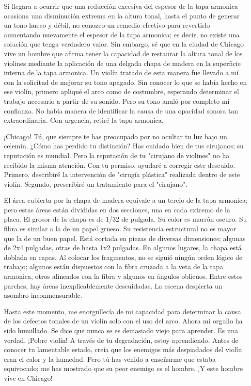 \documentclass[12pt]{book}
\begin{document}
Si llegara a ocurrir que una reducción excesiva del espesor de la tapa armonica ocasiona una disminución extrema en la altura tonal, hasta el punto de generar un tono hueco y débil, no conozco un remedio efectivo para revertirlo aumentando nuevamente el espesor de la tapa armonica; es decir, no existe una solución que tenga verdadero valor. Sin embargo, sé que en la ciudad de Chicago vive un hombre que afirma tener la capacidad de restaurar la altura tonal de los violines mediante la aplicación de una delgada chapa de madera en la superficie interna de la tapa armonica. Un violín tratado de esta manera fue llevado a mí con la solicitud de mejorar su tono apagado. Sin conocer lo que se había hecho en ese violín, primero apliqué el arco como de costumbre, esperando determinar el trabajo necesario a partir de su sonido. Pero su tono anuló por completo mi confianza. No había manera de identificar la causa de una opacidad sonora tan extraordinaria. Con urgencia, retiré la tapa armonica.

¡Chicago! Tú, que siempre te has preocupado por no ocultar tu luz bajo un celemín. ¿Cómo has perdido tu distinción? Has cuidado bien de tus cirujanos; su reputación es mundial. Pero la reputación de tu "cirujano de violines" no ha recibido la misma atención. Con tu permiso, ayudaré a corregir este descuido. Primero, describiré la intervención de "cirugía plástica" realizada dentro de este violín. Segundo, prescribiré un tratamiento para el "cirujano".

El área cubierta por la chapa de madera equivale a un tercio de la tapa armonica; pero estas áreas están divididas en dos secciones, una en cada extremo de la placa. El grosor de la chapa es de 1/32 de pulgada. Su color es marrón oscuro. Su fibra es similar a la de un papel grueso. Su resistencia estructural no es mayor que la de un buen papel. Está cortada en piezas de diversas dimensiones; algunas de 2x4 pulgadas, otras de hasta 1x2 pulgadas. En algunos lugares, la chapa está doblada en capas. Al colocar los fragmentos, no se siguió ningún orden lógico de trabajo; algunos están dispuestos con la fibra cruzada a la veta de la tapa armonica, otros alineados con la fibra y algunos en ángulos oblicuos. Entre estos parches, hay áreas inexplicablemente descuidadas. La escena despierta un asombro inconmensurable.

Hasta este momento, me enorgullecía de mi capacidad para determinar la causa de los defectos tonales de un violín solo con el uso del arco. Ahora mi orgullo ha sido humillado. Se dice que nunca se es demasiado viejo para aprender. Es una verdad. ¡Pobre violín! A través de tu degradación, estoy aprendiendo. Antes de conocer tu lamentable estado, creía que los enemigos más despiadados del violín eran el calor y la humedad. Pero tú has venido a enseñarme que estaba equivocado; me has mostrado que su peor enemigo es el hombre. ¡Y este hombre vive en Chicago!
\end{document}
